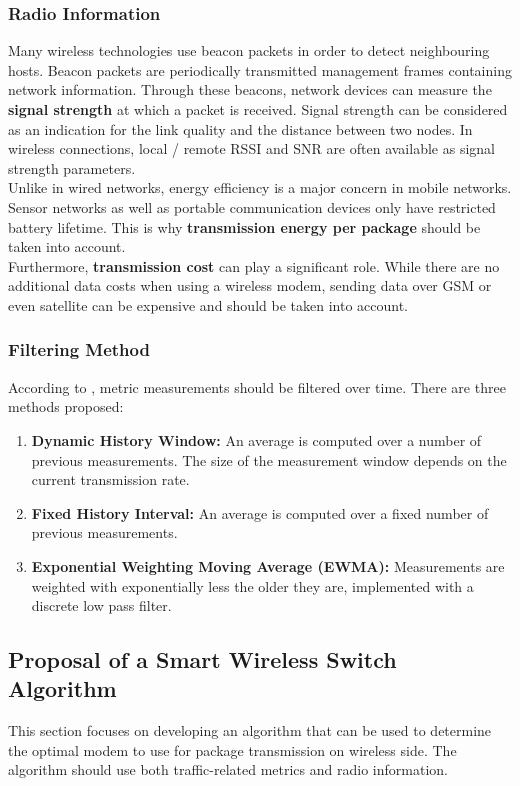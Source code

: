 \subsubsection{Radio Information}
Many wireless technologies use beacon packets in order to detect neighbouring hosts. Beacon packets are periodically transmitted management frames containing network information. Through these beacons, network devices can measure the \textbf{signal strength} at which a packet is received. Signal strength can be considered as an indication for the link quality and the distance between two nodes. In wireless connections, local / remote RSSI and SNR are often available as signal strength parameters.\\
Unlike in wired networks, energy efficiency is a major concern in mobile networks. Sensor networks as well as portable communication devices only have restricted battery lifetime. This is why \textbf{transmission energy per package} should be taken into account.\\
Furthermore, \textbf{transmission cost} can play a significant role. While there are no additional data costs when using a wireless modem, sending data over GSM or even satellite can be expensive and should be taken into account.
%
\subsubsection{Filtering Method} \label{subsec:txtFilteringMethod}
According to \cite{SurveyOnRoutingMetrics}, metric measurements should be filtered over time. There are three methods proposed:
\begin{enumerate}
    \item \textbf{Dynamic History Window:} An average is computed over a number of previous measurements. The size of the measurement window depends on the current transmission rate.
    \item \textbf{Fixed History Interval:} An average is computed over a fixed number of previous measurements.
    \item \textbf{Exponential Weighting Moving Average (EWMA):} Measurements are weighted with exponentially less the older they are, implemented with a discrete low pass filter.
\end{enumerate}
%
%
\subsection{Proposal of a Smart Wireless Switch Algorithm}
This section focuses on developing an algorithm that can be used to determine the optimal modem to use for package transmission on wireless side. The algorithm should use both traffic-related metrics and radio information.
%
